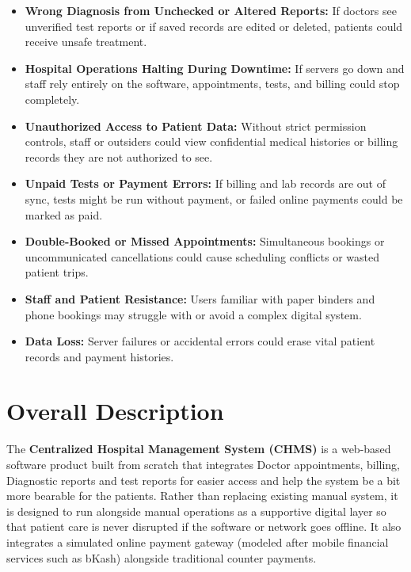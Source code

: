 \documentclass[11pt,a4paper]{article}
\begin{document}
\begin{itemize}

    \item \textbf{Wrong Diagnosis from Unchecked or Altered Reports:} If doctors see unverified test reports or if saved records are edited or deleted, patients could receive unsafe treatment.

    \item \textbf{Hospital Operations Halting During Downtime:} If servers go down and staff rely entirely on the software, appointments, tests, and billing could stop completely.

    \item \textbf{Unauthorized Access to Patient Data:} Without strict permission controls, staff or outsiders could view confidential medical histories or billing records they are not authorized to see.

    \item \textbf{Unpaid Tests or Payment Errors:} If billing and lab records are out of sync, tests might be run without payment, or failed online payments could be marked as paid.

    \item \textbf{Double-Booked or Missed Appointments:} Simultaneous bookings or uncommunicated cancellations could cause scheduling conflicts or wasted patient trips.

    \item \textbf{Staff and Patient Resistance:} Users familiar with paper binders and phone bookings may struggle with or avoid a complex digital system.

    \item \textbf{Data Loss:} Server failures or accidental errors could erase vital patient records and payment histories.

\end{itemize}

\section{Overall Description}

The \textbf{Centralized Hospital Management System (CHMS)} is a web-based software product built from scratch that integrates Doctor appointments, billing, Diagnostic reports and test reports for easier access and help the system be a bit more bearable for the patients. Rather than replacing existing manual system, it is designed to run alongside manual operations as a supportive digital layer so that patient care is never disrupted if the software or network goes offline. It also integrates a simulated online payment gateway (modeled after mobile financial services such as bKash) alongside traditional counter payments.
\end{document}
